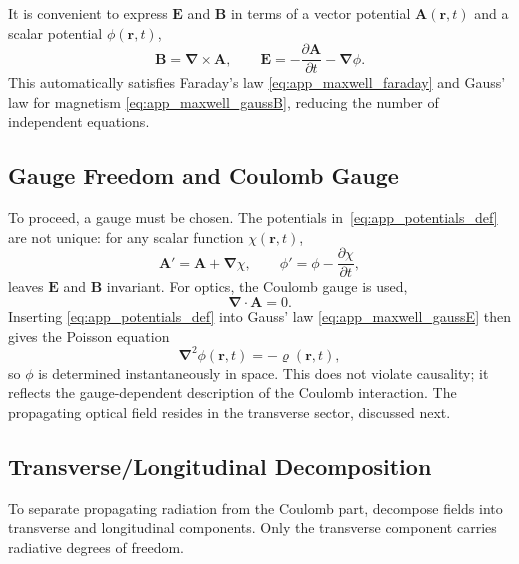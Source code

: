 It is convenient to express $\boldsymbol{E}$ and $\boldsymbol{B}$ in terms of a vector potential $\boldsymbol{A}(\boldsymbol{r},t)$ and a scalar potential $\phi(\boldsymbol{r},t)$,
\begin{equation}
	\boldsymbol{B} = \boldsymbol{\nabla}\times \boldsymbol{A},
	\qquad
	\boldsymbol{E} = -\frac{\partial \boldsymbol{A}}{\partial t} - \boldsymbol{\nabla}\phi.
	\label{eq:app_potentials_def}
\end{equation}
This automatically satisfies Faraday's law \cref{eq:app_maxwell_faraday} and Gauss' law for magnetism \cref{eq:app_maxwell_gaussB}, reducing the number of independent equations.

\subsection{Gauge Freedom and Coulomb Gauge}
\label{app:subsec:gauge_freedom}
To proceed, a gauge must be chosen. The potentials in~\autoref{eq:app_potentials_def} are not unique: for any scalar function $\chi(\boldsymbol{r},t)$,
\begin{equation*}
	\boldsymbol{A}' = \boldsymbol{A} + \boldsymbol{\nabla}\chi,
	\qquad
	\phi' = \phi - \frac{\partial \chi}{\partial t},
\end{equation*}
leaves $\boldsymbol{E}$ and $\boldsymbol{B}$ invariant. For optics, the Coulomb gauge is used,
\begin{equation*}
\boldsymbol{\nabla}\cdot\boldsymbol{A} = 0.
\end{equation*}
Inserting \autoref{eq:app_potentials_def} into Gauss' law \autoref{eq:app_maxwell_gaussE} then gives the Poisson equation
\begin{equation*}
	\boldsymbol{\nabla}^2\phi(\boldsymbol{r},t) = -\varrho(\boldsymbol{r},t),
\end{equation*}
so $\phi$ is determined instantaneously in space. This does not violate causality; it reflects the gauge-dependent description of the Coulomb interaction. The propagating optical field resides in the transverse sector, discussed next.

\subsection{Transverse/Longitudinal Decomposition}
\label{app:subsec:transverse_longitudinal}
To separate propagating radiation from the Coulomb part, decompose fields into transverse and longitudinal components. Only the transverse component carries radiative degrees of freedom.

